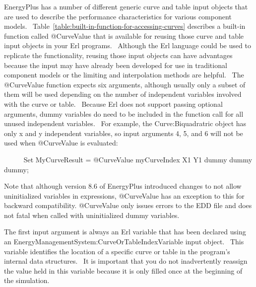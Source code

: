 EnergyPlus has a number of different generic curve and table input objects that are used to describe the performance characteristics for various component models.~ Table~\ref{table:built-in-function-for-accessing-curves} describes a built-in function called @CurveValue that is available for reusing those curve and table input objects in your Erl programs.~ Although the Erl language could be used to replicate the functionality, reusing those input objects can have advantages because the input may have already been developed for use in traditional component models or the limiting and interpolation methods are helpful.~ The @CurveValue function expects six arguments, although usually only a subset of them will be used depending on the number of independent variables involved with the curve or table.~ Because Erl does not support passing optional arguments, dummy variables do need to be included in the function call for all unused independent variables.~   For example, the Curve:Biquadratric object has only x and y independent variables, so input arguments 4, 5, and 6 will not be used when @CurveValue is evaluated:

~~~~~ Set MyCurveResult = @CurveValue myCurveIndex X1 Y1 dummy dummy dummy;

Note that although version 8.6 of EnergyPlus introduced changes to not allow uninitialized variables in expressions, @CurveValue has an exception to this for backward compatibility.  @CurveValue only issues errors to the EDD file and does not fatal when called with uninitialized dummy variables.

The first input argument is always an Erl variable that has been declared using an EnergyManagementSystem:CurveOrTableIndexVariable input object.~ This variable identifies the location of a specific curve or table in the program's internal data structures.~ It is important that you do not inadvertently reassign the value held in this variable because it is only filled once at the beginning of the simulation.

